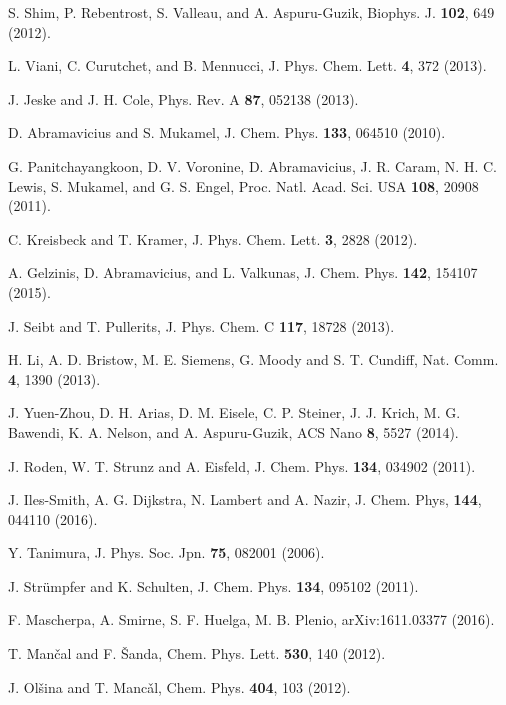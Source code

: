 \documentclass[%
 reprint,%
 amssymb, amsmath,%
 aip,cha,%
]{revtex4-1}
\begin{document}
\begin{thebibliography}{99}
 S. Shim, P. Rebentrost, S. Valleau, and A. Aspuru-Guzik, Biophys. J. {\bf 102}, 649 (2012).

 L. Viani, C. Curutchet, and B. Mennucci, J. Phys. Chem. Lett. {\bf 4}, 372 (2013).

 J. Jeske and J. H. Cole, Phys. Rev. A {\bf 87}, 052138 (2013).

 D. Abramavicius and S. Mukamel, J. Chem. Phys. {\bf 133}, 064510 (2010).

 G. Panitchayangkoon, D. V. Voronine, D. Abramavicius, J. R. Caram, N. H. C. Lewis, S. Mukamel, and G. S. Engel, Proc. Natl. Acad. Sci. USA {\bf 108}, 20908 (2011).

 C. Kreisbeck and T. Kramer, J. Phys. Chem. Lett. {\bf 3}, 2828 (2012).

 A. Gelzinis, D. Abramavicius, and L. Valkunas, J. Chem. Phys. {\bf 142}, 154107 (2015).

 J. Seibt and T. Pullerits, J. Phys. Chem. C {\bf 117}, 18728 (2013).

 H. Li, A. D. Bristow, M. E. Siemens, G. Moody and S. T. Cundiff, Nat. Comm. {\bf 4}, 1390 (2013).

 J. Yuen-Zhou, D. H. Arias, D. M. Eisele, C. P. Steiner, J. J. Krich, M. G. Bawendi, K. A. Nelson, and A. Aspuru-Guzik, ACS Nano {\bf 8}, 5527 (2014).

 J. Roden, W. T. Strunz and A. Eisfeld, J. Chem. Phys. {\bf 134}, 034902 (2011).

 J. Iles-Smith, A. G. Dijkstra, N. Lambert and A. Nazir, J. Chem. Phys, {\bf 144}, 044110 (2016).

 Y. Tanimura, J. Phys. Soc. Jpn. {\bf 75}, 082001 (2006).

 J. Str{\"u}mpfer and K. Schulten, J. Chem. Phys. {\bf 134}, 095102 (2011).

 F. Mascherpa, A. Smirne, S. F. Huelga, M. B. Plenio, arXiv:1611.03377 (2016).

 T. Man{\v c}al and F. {\v S}anda, Chem. Phys. Lett. {\bf 530}, 140 (2012).

 J. Ol{\v s}ina and T. Manc{\v a}l, Chem. Phys. {\bf 404}, 103 (2012).


\end{thebibliography}
\end{document}
